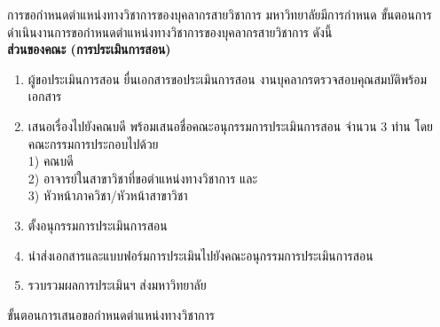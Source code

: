 
การขอกำหนดตำแหน่งทางวิชาการของบุคลากรสายวิชาการ มหาวิทยาลัยมีการกำหนด
ขั้นตอนการดำเนินงานการขอกำหนดตำแหน่งทางวิชาการของบุคลากรสายวิชาการ ดังนี้\\

\noindent
{\bf ส่วนของคณะ (การประเมินการสอน)}
\begin{enumerate}
\item ผู้ขอประเมินการสอน ยื่นเอกสารขอประเมินการสอน  งานบุคลากรตรวจสอบคุณสมบัติพร้อมเอกสาร
\item เสนอเรื่องไปยังคณบดี พร้อมเสนอชื่อคณะอนุกรรมการประเมินการสอน จำนวน 3 ท่าน โดย
คณะกรรมการประกอบไปด้วย \\1) คณบดี \\2) อาจารย์ในสาขาวิชาที่ขอตำแหน่งทางวิชาการ และ \\3) หัวหน้าภาควิชา/หัวหน้าสาขาวิชา
\item ตั้งอนุกรรมการประเมินการสอน 
\item นำส่งเอกสารและแบบฟอร์มการประเมินไปยังคณะอนุกรรมการประเมินการสอน
\item  รวบรวมผลการประเมินฯ ส่งมหาวิทยาลัย 
\end{enumerate}
ขั้นตอนการเสนอขอกำหนดตำแหน่งทางวิชาการ
